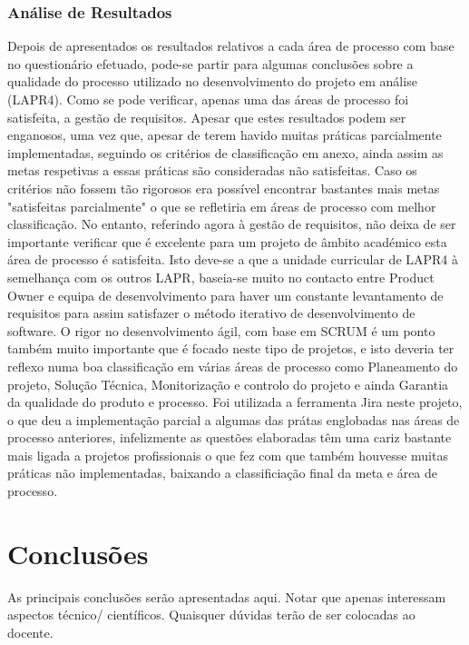 \documentclass[openany,10pt,a4paper]{article}
\begin{document}
\subsubsection{Análise de Resultados}
Depois de apresentados os resultados relativos a cada área de processo com base no questionário efetuado, pode-se partir para algumas conclusões sobre a qualidade do processo utilizado no desenvolvimento do projeto em análise (LAPR4).
Como se pode verificar, apenas uma das áreas de processo foi satisfeita, a gestão de requisitos. Apesar que estes resultados podem ser enganosos, uma vez que, apesar de terem havido muitas práticas parcialmente implementadas, seguindo os critérios de classificação em anexo, ainda assim as metas respetivas a essas práticas são consideradas não satisfeitas.
Caso os critérios não fossem tão rigorosos era possível encontrar bastantes mais metas "satisfeitas parcialmente" o que se refletiria em áreas de processo com melhor classificação.
No entanto, referindo agora à gestão de requisitos, não deixa de ser importante verificar que é excelente para um projeto de âmbito académico esta área de processo é satisfeita. Isto deve-se a que a unidade curricular de LAPR4 à semelhança com os outros LAPR, baseia-se muito no contacto entre Product Owner e equipa de desenvolvimento para haver um constante levantamento de requisitos para assim satisfazer o método iterativo de desenvolvimento de software.
O rigor no desenvolvimento ágil, com base em SCRUM é um ponto também muito importante que é focado neste tipo de projetos, e isto deveria ter reflexo numa boa classificação em várias áreas de processo como Planeamento do projeto, Solução Técnica, Monitorização e controlo do projeto e ainda Garantia da qualidade do produto e processo. Foi utilizada a ferramenta Jira neste projeto, o que deu a implementação parcial a algumas das prátas englobadas nas áreas de processo anteriores, infelizmente as questões elaboradas têm uma cariz bastante mais ligada a projetos profissionais o que fez com que também houvesse muitas práticas não implementadas, baixando a classificiação final da meta e área de processo.

\section{Conclusões}


As principais conclusões serão apresentadas aqui. Notar que apenas interessam aspectos técnico/ científicos. Quaisquer dúvidas terão de ser colocadas ao docente.
\end{document}
